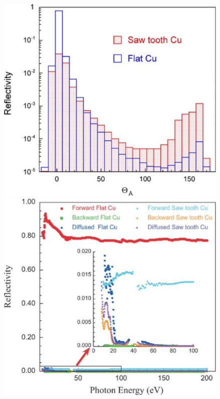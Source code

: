 \begin{figure}[tbh]
    \centering
    \begin{minipage}[c]{0.47\textwidth}
        \includegraphics[width=\textwidth]{../ss/mahne_refl.png}
    \end{minipage}
    \hspace{0.5cm}
    \begin{minipage}[c]{0.47\textwidth}
        \includegraphics[width=\textwidth]{../ss/mahne_yield.png}
    \end{minipage}


\end{figure}
